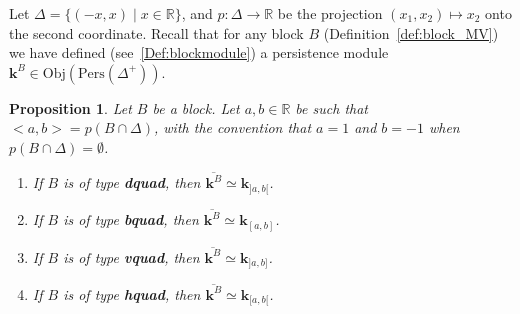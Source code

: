 \documentclass[a4paper, english, 11pt]{article}
\newcommand{\kk}[0]{\textbf{k}}
\newcommand{\Pe}{\text{Pers}}
\newcommand{\0}{\vec{0}}
\newcommand{\R}[0]{\mathbb{R}}
\newcommand{\Obj}[0]{\text{Obj}}
\newtheorem{prop}{Proposition}[section]
\begin{document}
Let $\Delta = \{(-x,x)\mid x\in\R\}$, and $p : \Delta \longrightarrow \R$ be the projection $(x_1,x_2)\mapsto x_2$ onto the second coordinate. Recall that for any block $B$ (Definition~\ref{def:block_MV}) we have defined (see~\ref{Def:blockmodule}) a persistence module $\kk^B\in \Obj(\Pe(\Delta^+))$.
\begin{prop}\label{P:BarofBlock}
Let $B$ be a block. Let $a,b\in \R$ be such that $<a,b> = p(B\cap \Delta)$, with the convention that $a=1$ and $b=-1$ when $ p(B\cap \Delta) = \emptyset$.  
\begin{enumerate}
    \item If $B$ is of type \textbf{dquad}, then $\overline{\kk^B} \simeq \kk_{]a,b[}$.
    \item If $B$ is of type \textbf{bquad}, then $\overline{\kk^B} \simeq \kk_{[a,b]}$.
    \item If $B$ is of type \textbf{vquad}, then $\overline{\kk^B} \simeq \kk_{]a,b]}$.
    \item If $B$ is of type \textbf{hquad}, then $\overline{\kk^B} \simeq \kk_{[a,b[}$.
\end{enumerate}
\end{prop}
\end{document}
